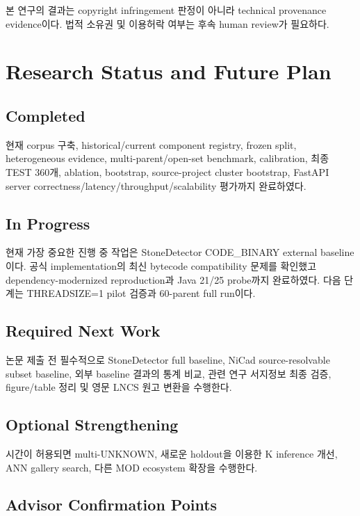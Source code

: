 \documentclass[runningheads]{llncs}
\begin{document}
본 연구의 결과는 copyright infringement 판정이 아니라 technical provenance
evidence이다. 법적 소유권 및 이용허락 여부는 후속 human review가 필요하다.

\section{Research Status and Future Plan}

\subsection{Completed}

현재 corpus 구축, historical/current component registry, frozen split,
heterogeneous evidence, multi-parent/open-set benchmark, calibration,
최종 TEST 360개, ablation, bootstrap, source-project cluster bootstrap,
FastAPI server correctness/latency/throughput/scalability 평가까지 완료하였다.

\subsection{In Progress}

현재 가장 중요한 진행 중 작업은 StoneDetector CODE\_BINARY external
baseline이다. 공식 implementation의 최신 bytecode compatibility 문제를
확인했고 dependency-modernized reproduction과 Java 21/25 probe까지 완료하였다.
다음 단계는 THREADSIZE=1 pilot 검증과 60-parent full run이다.

\subsection{Required Next Work}

논문 제출 전 필수적으로 StoneDetector full baseline, NiCad source-resolvable
subset baseline, 외부 baseline 결과의 통계 비교, 관련 연구 서지정보 최종 검증,
figure/table 정리 및 영문 LNCS 원고 변환을 수행한다.

\subsection{Optional Strengthening}

시간이 허용되면 multi-UNKNOWN, 새로운 holdout을 이용한 K inference 개선,
ANN gallery search, 다른 MOD ecosystem 확장을 수행한다.

\subsection{Advisor Confirmation Points}
\end{document}
